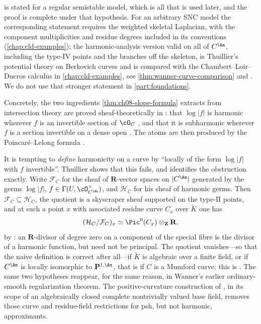 \begin{remark}[Scope]
\label{rem:ch08-slope-general-scope}
 is stated for a regular semistable model, which
is all that is used later, and the proof is complete under that hypothesis.
For an arbitrary SNC model the corresponding statement requires the
weighted skeletal Laplacian, with the component multiplicities and residue
degrees included in its conventions (\cref{chap:cld-examples}); the harmonic-analysis version valid on all of
$C^{\An}$, including the type-$\mathrm{IV}$ points and the branches off the
skeleton, is Thuillier's potential theory on Berkovich curves \cite{Thu05}
and is compared with the Chambert--Loir--Ducros calculus in
\cref{chap:cld-examples}, see \cref{thm:wanner-curve-comparison} and
\cite{Wanner19,GR25PL}.  We do not use that stronger statement in
\cref{part:foundations}.

Concretely, the two ingredients \cref{thm:ch08-slope-formula} extracts from
intersection theory are proved sheaf-theoretically in \cite{Thu05}: that
$\log|f|$ is harmonic wherever $f$ is an invertible section of $\cO_C$
\cite[Prop.~2.3.20]{Thu05}, and that it is subharmonic wherever $f$ is a
section invertible on a dense open \cite[Prop.~3.1.6]{Thu05}.  The atoms are
then produced by the Poincar\'e--Lelong formula \cite[\S3.3.3]{Thu05}.
\end{remark}

\begin{remark}
\label{rem:ch08-harmonic-vs-log}
It is tempting to \emph{define} harmonicity on a curve by ``locally of the
form $\log|f|$ with $f$ invertible''.  Thuillier shows that this fails, and
identifies the obstruction exactly.  Write $\mathcal F_C$ for the sheaf of
$\mathbf R$-vector spaces on $|C^{\An}|$ generated by the germs $\log|f|$,
$f\in\Gamma(U,\cO_{C^{\An}}^{\times})$, and $\mathcal H_C$ for his sheaf of
harmonic germs.  Then $\mathcal F_C\subseteq\mathcal H_C$, the quotient is a
skyscraper sheaf supported on the type-$\mathrm{II}$ points, and at such a
point $x$ with associated residue curve $C_x$ over $\widetilde K$ one has
\[
 (\mathcal H_C/\mathcal F_C)_x\simeq\Pic^0(C_x)\otimes_{\mathbf Z}\mathbf R ,
\]
by \cite[Lem.~2.3.22]{Thu05}: an $\mathbf R$-divisor of degree zero on a
component of the special fibre is the divisor of a harmonic function, but
need not be principal.  The quotient vanishes---so that the naive definition
is correct after all---if $\widetilde K$ is algebraic over a finite field, or
if $C^{\An}$ is locally isomorphic to $\mathbf P^{1,\An}$, that is if $C$ is
a Mumford curve; this is \cite[Thm.~2.3.21]{Thu05}.  The same two hypotheses
reappear, for the same reason, in Wanner's earlier ordinary-smooth
regularization theorem.  The positive-curvature construction of
, in its scope of an
algebraically closed complete nontrivially valued base field, removes those
curve and residue-field restrictions for psh, but not harmonic,
approximants.
\end{remark}


